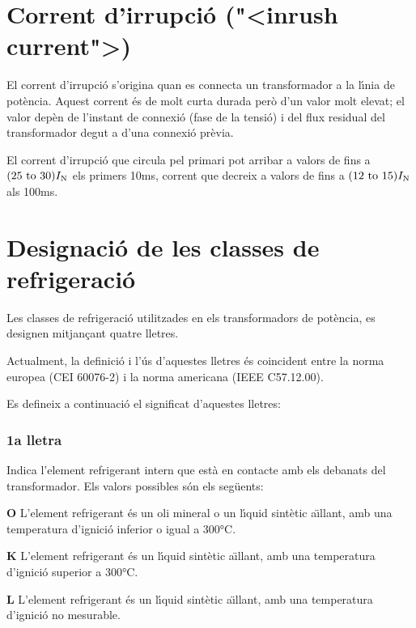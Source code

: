 \section{Corrent d'irrupci\'{o} ({"<}inrush current{">})}

El corrent d'irrupci\'{o} s'origina quan es  connecta un transformador a la l\'{\i}nia de pot\`{e}ncia. Aquest corrent \'{e}s de molt curta durada per\`{o} d'un valor molt elevat; el valor dep\`{e}n de l'instant de connexi\'{o} (fase de la tensi\'{o}) i del flux residual del transformador degut a d'una connexi\'{o} pr\`{e}via.

El corrent d'irrupci\'{o} que circula pel primari pot arribar a valors de fins a $(\numrange{25}{30}) I\ped{N}$ els primers 10\unit{ms}, corrent que decreix a valors de fins  a $(\numrange{12}{15}) I\ped{N}$ als 100\unit{ms}.

\section{Designaci\'{o} de les classes de refrigeraci\'{o}}\label{sec:trafos-pot-refrig}
 

Les classes de refrigeraci\'{o} utilitzades en els transformadors de
pot\`{e}ncia, es designen mitjan\c{c}ant quatre lletres.

Actualment, la definici\'{o} i l'\'{u}s d'aquestes lletres \'{e}s coincident
entre la norma europea (\textsf{CEI 60076-2}) i la norma americana
(\textsf{IEEE C57.12.00}).

Es defineix a continuaci\'{o} el significat d'aquestes lletres:

\subsubsection*{1a lletra}
Indica l'element refrigerant intern que est\`{a} en
contacte amb els debanats del transformador. Els valors possibles
s\'{o}n els seg\"{u}ents:

\begin{list}{}
   {\setlength{\labelwidth}{10mm} \setlength{\leftmargin}{10mm} \setlength{\labelsep}{2mm}}
   \item[\textbf{O}] L'element refrigerant \'{e}s un oli mineral o un l\'{\i}quid sint\`{e}tic a\"{\i}llant, amb una temperatura d'ignici\'{o}
   inferior o igual a 300\unit{\celsius}.
   \item[\textbf{K}] L'element refrigerant \'{e}s un l\'{\i}quid sint\`{e}tic a\"{\i}llant, amb una temperatura d'ignici\'{o}
   superior a 300\unit{\celsius}.
   \item[\textbf{L}] L'element refrigerant \'{e}s un l\'{\i}quid sint\`{e}tic a\"{\i}llant, amb una temperatura d'ignici\'{o}
   no mesurable.
\end{list}
  

